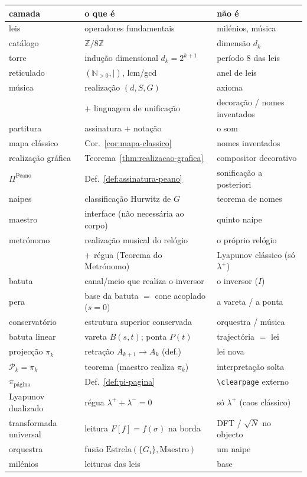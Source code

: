 \documentclass[11pt,a4paper]{article}
\begin{document}
\begin{center}\small
\begin{tabular}{@{}lll@{}}
camada & o que é & não é \\
\hline
leis & operadores fundamentais & milénios, música \\
catálogo & $\mathbb{Z}/8\mathbb{Z}$ & dimensão $d_k$ \\
torre & indução dimensional $d_k=2^{k+1}$ & período 8 das leis \\
reticulado & $(\mathbb{N}_{>0},\mid)$, lcm/gcd & anel de leis \\
música & realização $(d,S,G)$ & axioma \\
  & $+$ linguagem de unificação & decoração / nomes inventados \\
partitura & assinatura $+$ notação & o som \\
mapa clássico & Cor.~\ref{cor:mapa-classico} & nomes inventados \\
realização gráfica & Teorema~\ref{thm:realizacao-grafica} & compositor decorativo \\
$\Pi^{\mathrm{Peano}}$ & Def.~\ref{def:assinatura-peano} & sonificação a posteriori \\
naipes & classificação Hurwitz de $G$ & teorema de nomes \\
maestro & interface (não necessária ao corpo) & quinto naipe \\
metrónomo & realização musical do relógio & o próprio relógio \\
  & $+$ régua (Teorema do Metrónomo) & Lyapunov clássico (só $\lambda^{+}$) \\
batuta & canal/meio que realiza o inversor & o inversor ($I$) \\
pera & base da batuta $=$ cone acoplado ($s=0$) & a vareta / a ponta \\
conservatório & estrutura superior conservada & orquestra / música \\
batuta linear & vareta $B(s,t)$; ponta $P(t)$ & trajectória $=$ lei \\
projecção $\pi_k$ & retração $A_{k+1}\to A_k$ (def.) & lei nova \\
$\mathcal{P}_k=\pi_k$ & teorema (maestro realiza $\pi_k$) & interpretação solta \\
$\pi_{\mathrm{página}}$ & Def.~\ref{def:pi-pagina} & \texttt{\textbackslash clearpage} externo \\
Lyapunov dualizado & régua $\lambda^{+}{+}\lambda^{-}=0$ & só $\lambda^{+}$ (caos clássico) \\
transformada universal & leitura $F[f]=f(\sigma)$ na borda & DFT / $\sqrt N$ no objecto \\
orquestra & fusão $\mathrm{Estrela}(\{G_i\},\mathrm{Maestro})$ & um naipe \\
milénios & leituras das leis & base \\
\end{tabular}
\end{center}
\end{document}
